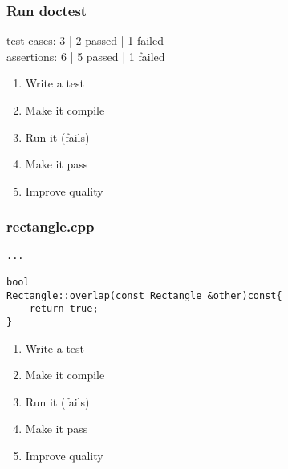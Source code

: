 \begin{frame}[fragile]
\frametitle{Run doctest}
\begin{minipage}[t]{0.48\linewidth}
test cases: 3 | 2 passed | 1 failed\\
assertions: 6 | 5 passed | 1 failed\\
\end{minipage}\hfill
\begin{minipage}[t]{0.28\linewidth}
  \small
  \begin{enumerate} 
    \item \textcolor{deadcolor}{Write a test}
    \item \textcolor{deadcolor}{Make it compile}
    \item \textcolor{activecolor}{Run it (fails)}
    \item \textcolor{deadcolor}{Make it pass}
    \item \textcolor{deadcolor}{Improve quality}
  \end{enumerate} 
\end{minipage}
\end{frame}


\begin{frame}[fragile]
\frametitle{rectangle.cpp}
\begin{minipage}[t]{0.48\linewidth}
\begin{lstlisting}
...

bool 
Rectangle::overlap(const Rectangle &other)const{
    return true;
}
\end{lstlisting}
\end{minipage}\hfill
\begin{minipage}[t]{0.28\linewidth}
  \small
  \begin{enumerate} 
    \item \textcolor{deadcolor}{Write a test}
    \item \textcolor{deadcolor}{Make it compile}
    \item \textcolor{deadcolor}{Run it (fails)}
    \item \textcolor{activecolor}{Make it pass}
    \item \textcolor{deadcolor}{Improve quality}
  \end{enumerate} 
\end{minipage}
\end{frame}


